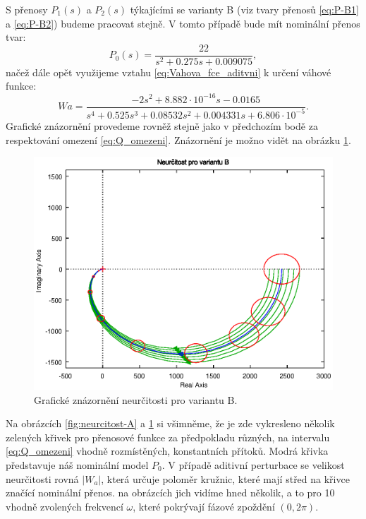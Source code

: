 \documentclass[a4paper,11pt]{article}
\begin{document}
S přenosy $ P_{1}\left ( s \right ) $ a $ P_{2}\left ( s \right ) $ týkajícími se varianty B (viz tvary přenosů \ref{eq:P-B1} a \ref{eq:P-B2}) budeme pracovat stejně. V tomto případě bude mít nominální přenos tvar:
\begin{equation}\label{eq:P-B0} 
P_{0}\left ( s \right ) =\frac{22}{s^{2} + 0.275 s + 0.009075},
\end{equation}
načež dále opět využijeme vztahu \ref{eq:Vahova_fce_aditvni} k určení váhové funkce:
\begin{equation}\label{eq:Wa-B}
Wa = \frac{-2s^{2} + 8.882\cdot 10^{-16}s - 0.0165}{s^{4} + 0.525 s^{3} + 0.08532 s^{2} + 0.004331 s + 6.806\cdot 10^{-5}}.
\end{equation}
Grafické znázornění provedeme rovněž stejně jako v předchozím bodě za respektování omezení \ref{eq:Q_omezeni}. Znázornění je možno vidět na obrázku \ref{fig:neurcitost-B}.
\begin{figure}[htbp]
	\begin{center}
	\includegraphics[scale = 1.0]{obrazky/neurcitostB.eps}
	\caption{Grafické znázornění neurčitosti pro variantu B.}
	\label{fig:neurcitost-B}
	\end{center}
\end{figure}

\newpage
Na obrázcích \ref{fig:neurcitost-A} a \ref{fig:neurcitost-B} si všimněme, že je zde vykresleno několik zelených křivek pro přenosové funkce za předpokladu různých, na intervalu \ref{eq:Q_omezeni} vhodně rozmístěných, konstantních přítoků. Modrá křivka představuje náš nominální model $ P_{0} $. V případě aditivní perturbace se velikost neurčitosti rovná $ \left | W_{a} \right | $, která určuje poloměr kružnic, které mají střed na křivce značící nominální přenos. na obrázcích jich vidíme hned několik, a to pro 10 vhodně zvolených frekvencí $ \omega $, které pokrývají fázové zpoždění $ \left ( 0, 2\pi  \right ) $.
\end{document}
